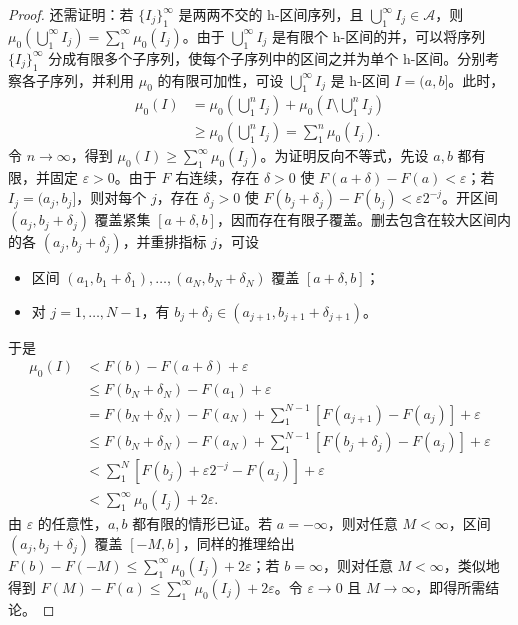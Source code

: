 \documentclass[../../main.tex]{subfiles}%
\begin{document}
\begin{proof}
还需证明：若 $\{I_j\}_1^\infty$ 是两两不交的 h-区间序列，且 $\bigcup_1^\infty I_j\in\mathscr{A}$，则 $\mu_0(\bigcup_1^\infty I_j)=\sum_1^\infty\mu_0(I_j)$。由于 $\bigcup_1^\infty I_j$ 是有限个 h-区间的并，可以将序列 $\{I_j\}_1^\infty$ 分成有限多个子序列，使每个子序列中的区间之并为单个 h-区间。分别考察各子序列，并利用 $\mu_0$ 的有限可加性，可设 $\bigcup_1^\infty I_j$ 是 h-区间 $I=(a,b]$。此时，
\begin{align*}
\mu_0(I)&=\mu_0\left(\bigcup_1^n I_j\right)+\mu_0\left(I\setminus\bigcup_1^n I_j\right)\\
&\geqslant\mu_0\left(\bigcup_1^n I_j\right)=\sum_1^n\mu_0(I_j).
\end{align*}
令 $n\to\infty$，得到 $\mu_0(I)\geqslant\sum_1^\infty\mu_0(I_j)$。为证明反向不等式，先设 $a,b$ 都有限，并固定 $\varepsilon>0$。由于 $F$ 右连续，存在 $\delta>0$ 使 $F(a+\delta)-F(a)<\varepsilon$；若 $I_j=(a_j,b_j]$，则对每个 $j$，存在 $\delta_j>0$ 使 $F(b_j+\delta_j)-F(b_j)<\varepsilon2^{-j}$。开区间 $(a_j,b_j+\delta_j)$ 覆盖紧集 $[a+\delta,b]$，因而存在有限子覆盖。删去包含在较大区间内的各 $(a_j,b_j+\delta_j)$，并重排指标 $j$，可设
\begin{itemize}
\item 区间 $(a_1,b_1+\delta_1),\ldots,(a_N,b_N+\delta_N)$ 覆盖 $[a+\delta,b]$；
\item 对 $j=1,\ldots,N-1$，有 $b_j+\delta_j\in(a_{j+1},b_{j+1}+\delta_{j+1})$。
\end{itemize}
于是
\begin{align*}
\mu_0(I)&<F(b)-F(a+\delta)+\varepsilon\\
&\leqslant F(b_N+\delta_N)-F(a_1)+\varepsilon\\
&=F(b_N+\delta_N)-F(a_N)+\sum_1^{N-1}[F(a_{j+1})-F(a_j)]+\varepsilon\\
&\leqslant F(b_N+\delta_N)-F(a_N)+\sum_1^{N-1}[F(b_j+\delta_j)-F(a_j)]+\varepsilon\\
&<\sum_1^N[F(b_j)+\varepsilon2^{-j}-F(a_j)]+\varepsilon\\
&<\sum_1^\infty\mu_0(I_j)+2\varepsilon.
\end{align*}
由 $\varepsilon$ 的任意性，$a,b$ 都有限的情形已证。若 $a=-\infty$，则对任意 $M<\infty$，区间 $(a_j,b_j+\delta_j)$ 覆盖 $[-M,b]$，同样的推理给出 $F(b)-F(-M)\leqslant\sum_1^\infty\mu_0(I_j)+2\varepsilon$；若 $b=\infty$，则对任意 $M<\infty$，类似地得到 $F(M)-F(a)\leqslant\sum_1^\infty\mu_0(I_j)+2\varepsilon$。令 $\varepsilon\to0$ 且 $M\to\infty$，即得所需结论。
\end{proof}
\end{document}
